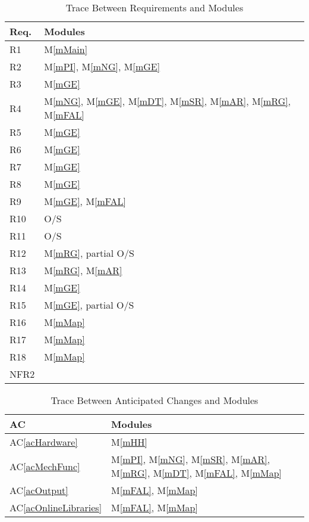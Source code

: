 \documentclass[12pt, titlepage]{article}
\newcommand{\acref}[1]{AC\ref{#1}}
\newcommand{\mref}[1]{M\ref{#1}}
\begin{document}
\begin{table}[H]
\centering
\begin{tabular}{p{} p{}}
\toprule
\textbf{Req.} & \textbf{Modules}\\
\midrule
R1 & \mref{mMain}\\
R2 & \mref{mPI}, \mref{mNG}, \mref{mGE}\\
R3 & \mref{mGE}\\
R4 & \mref{mNG}, \mref{mGE}, \mref{mDT}, \mref{mSR}, \mref{mAR}, \mref{mRG}, \mref{mFAL}\\
R5 & \mref{mGE}\\
R6 & \mref{mGE}\\
R7 & \mref{mGE}\\
R8 & \mref{mGE}\\
R9 & \mref{mGE}, \mref{mFAL}\\
R10 & O/S\\
R11 & O/S\\
R12 & \mref{mRG}, partial O/S\\
R13 & \mref{mRG}, \mref{mAR}\\
R14 & \mref{mGE}\\
R15 & \mref{mGE}, partial O/S\\
R16 & \mref{mMap}\\
R17 & \mref{mMap}\\
R18 & \mref{mMap}\\
NFR2 & 
\bottomrule
\end{tabular}
\caption{Trace Between Requirements and Modules}
\label{TblRT}
\end{table}

\begin{table}[H]
\centering
\begin{tabular}{p{} p{}}
\toprule
\textbf{AC} & \textbf{Modules}\\
\midrule
\acref{acHardware} & \mref{mHH}\\
\acref{acMechFunc} & \mref{mPI}, \mref{mNG}, \mref{mSR}, \mref{mAR}, \mref{mRG}, \mref{mDT}, \mref{mFAL}, \mref{mMap}\\
\acref{acOutput} & \mref{mFAL}, \mref{mMap}\\
\acref{acOnlineLibraries} & \mref{mFAL}, \mref{mMap}\\
\bottomrule
\end{tabular}
\caption{Trace Between Anticipated Changes and Modules}
\label{TblACT}
\end{table}
\end{document}
